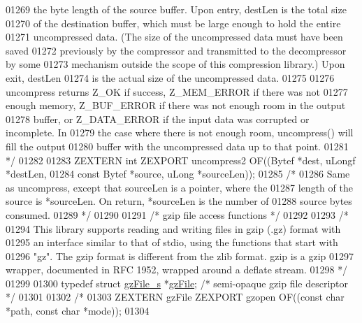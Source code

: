 \begin{DoxyCode}
01269 \textcolor{comment}{   the byte length of the source buffer.  Upon entry, destLen is the total size}
01270 \textcolor{comment}{   of the destination buffer, which must be large enough to hold the entire}
01271 \textcolor{comment}{   uncompressed data.  (The size of the uncompressed data must have been saved}
01272 \textcolor{comment}{   previously by the compressor and transmitted to the decompressor by some}
01273 \textcolor{comment}{   mechanism outside the scope of this compression library.) Upon exit, destLen}
01274 \textcolor{comment}{   is the actual size of the uncompressed data.}
01275 \textcolor{comment}{}
01276 \textcolor{comment}{     uncompress returns Z\_OK if success, Z\_MEM\_ERROR if there was not}
01277 \textcolor{comment}{   enough memory, Z\_BUF\_ERROR if there was not enough room in the output}
01278 \textcolor{comment}{   buffer, or Z\_DATA\_ERROR if the input data was corrupted or incomplete.  In}
01279 \textcolor{comment}{   the case where there is not enough room, uncompress() will fill the output}
01280 \textcolor{comment}{   buffer with the uncompressed data up to that point.}
01281 \textcolor{comment}{*/}
01282 
01283 ZEXTERN \textcolor{keywordtype}{int} ZEXPORT uncompress2 OF((Bytef *dest,   uLongf *destLen,
01284                                     \textcolor{keyword}{const} Bytef *source, uLong *sourceLen));
01285 \textcolor{comment}{/*}
01286 \textcolor{comment}{     Same as uncompress, except that sourceLen is a pointer, where the}
01287 \textcolor{comment}{   length of the source is *sourceLen.  On return, *sourceLen is the number of}
01288 \textcolor{comment}{   source bytes consumed.}
01289 \textcolor{comment}{*/}
01290 
01291                         \textcolor{comment}{/* gzip file access functions */}
01292 
01293 \textcolor{comment}{/*}
01294 \textcolor{comment}{     This library supports reading and writing files in gzip (.gz) format with}
01295 \textcolor{comment}{   an interface similar to that of stdio, using the functions that start with}
01296 \textcolor{comment}{   "gz".  The gzip format is different from the zlib format.  gzip is a gzip}
01297 \textcolor{comment}{   wrapper, documented in RFC 1952, wrapped around a deflate stream.}
01298 \textcolor{comment}{*/}
01299 
01300 \textcolor{keyword}{typedef} \textcolor{keyword}{struct }\hyperlink{structgz_file__s}{gzFile\_s} *\hyperlink{structgz_file__s}{gzFile};    \textcolor{comment}{/* semi-opaque gzip file descriptor */}
01301 
01302 \textcolor{comment}{/*}
01303 \textcolor{comment}{ZEXTERN gzFile ZEXPORT gzopen OF((const char *path, const char *mode));}
01304 \textcolor{comment}{}

\end{DoxyCode}

